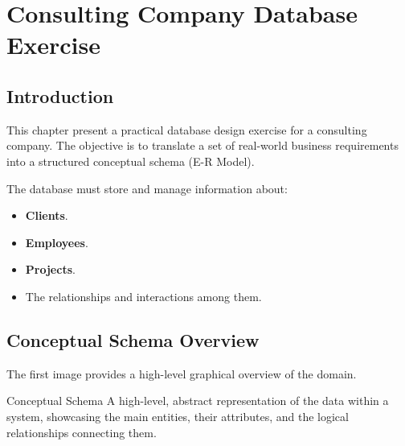 \section{Consulting Company Database Exercise}

\subsection{Introduction}
This chapter present a practical database design exercise for a consulting company. The objective is to translate a set of real-world business requirements into a structured conceptual schema (E-R Model).

The database must store and manage information about:
\begin{itemize}
    \item \textbf{Clients}.
    \item \textbf{Employees}.
    \item \textbf{Projects}.
    \item The relationships and interactions among them.
\end{itemize}

\subsection{Conceptual Schema Overview}
The first image provides a high-level graphical overview of the domain. 

\begin{defbox}{Conceptual Schema}
A high-level, abstract representation of the data within a system, showcasing the main entities, their attributes, and the logical relationships connecting them.
\end{defbox}

